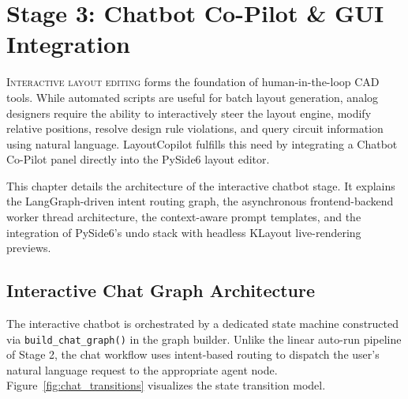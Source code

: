 
\usetikzlibrary{fit,backgrounds}

\chapter[Chatbot Co-Pilot \& GUI Integration]{Stage 3: Chatbot Co-Pilot \& GUI Integration}
\label{ch:chatbot_copilot}

\lettrine[lines=3]{I}{nteractive layout editing} forms the foundation of human-in-the-loop CAD tools. While automated scripts are useful for batch layout generation, analog designers require the ability to interactively steer the layout engine, modify relative positions, resolve design rule violations, and query circuit information using natural language. LayoutCopilot fulfills this need by integrating a Chatbot Co-Pilot panel directly into the PySide6 layout editor.

This chapter details the architecture of the interactive chatbot stage. It explains the LangGraph-driven intent routing graph, the asynchronous frontend-backend worker thread architecture, the context-aware prompt templates, and the integration of PySide6's undo stack with headless KLayout live-rendering previews.

\section[Chat Graph Architecture]{Interactive Chat Graph Architecture}
\label{sec:chat_graph}

The interactive chatbot is orchestrated by a dedicated state machine constructed via \texttt{build\_}\allowbreak\texttt{chat\_}\allowbreak\texttt{graph()} in the graph builder. Unlike the linear auto-run pipeline of Stage 2, the chat workflow uses intent-based routing to dispatch the user's natural language request to the appropriate agent node. Figure~\ref{fig:chat_transitions} visualizes the state transition model.

